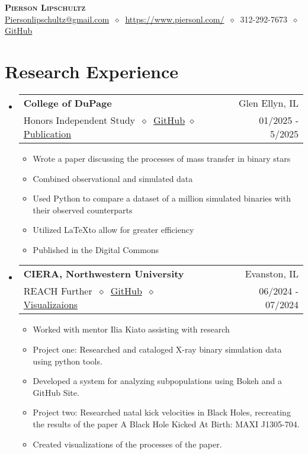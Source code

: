\documentclass[letterpaper,11pt]{article}
\makeatletter
\newcommand{\cvitem}[1]{
  \item\small{
    {#1\vspace{-2pt}}
  }
}
\newcommand{\cvheading}[4]{
  \vspace{-2pt}\item
    \begin{tabular*}{\textwidth}[t]{l@{\extracolsep{\fill}}r}
      \textbf{#1} & #2 \\
      \small#3 & \small #4 \\
    \end{tabular*}\vspace{-7pt}
}
\newcommand{\cvheadingstart}{\begin{itemize}[leftmargin=0in, label={}]}
\newcommand{\cvheadingend}{\end{itemize}}
\newcommand{\cvitemstart}{\begin{itemize}[label=\textopenbullet]\justifying}
\newcommand{\cvitemend}{\end{itemize}\vspace{-5pt}}
\makeatother
\begin{document}
\begin{center}
  \textbf{\LARGE\scshape Pierson Lipschultz} \\
  \vspace{1pt}\small
  \href{mailto:}{Piersonlipschultz@gmail.com}
  $\ \diamond\ $
  \href{https://www.piersonl.com/}{https://www.piersonl.com/}
  $\ \diamond\ $ 
  312-292-7673
  $\ \diamond\ $
  \href{https://github.com/PiersonLip}{GitHub}
\end{center}

\section{Research Experience}
\cvheadingstart
  \cvheading
    {College of DuPage}{Glen Ellyn, IL}
    {Honors Independent Study $\ \diamond\ $ \href{https://github.com/PiersonLip/Honors-Independent-Study}{GitHub} $\diamond$ \href{https://dc.cod.edu/srs/2025/schedule/25/}{Publication}}{01/2025 - 5/2025}
  \cvitemstart
    \cvitem{Wrote a paper discussing the processes of mass transfer in binary stars}
    \cvitem{Combined observational and simulated data}
    \cvitem{Used Python to compare a dataset of a million simulated binaries with their observed counterparts}
    \cvitem{Utilized \LaTeX to allow for greater efficiency}
    \cvitem{Published in the Digital Commons}
  \cvitemend

  \cvheading
    {CIERA, Northwestern University}{Evanston, IL}
    {REACH Further $\ \diamond\ $ \href{https://piersonlip.github.io/XB/}{GitHub} $\ \diamond\ $ \href{https://youtube.com/playlist?list=PLq73rWo79HTuEUPYdUz11PpY6DLhuF9Wl\&si=VjHikj-V-IePgofn}{Visualizaions}}{06/2024 - 07/2024}

  \cvitemstart
    \cvitem{Worked with mentor Ilia Kiato assisting with research}
    \cvitem{Project one: Researched and cataloged X-ray binary simulation data using python tools.}
    \cvitem{Developed a system for analyzing subpopulations using Bokeh and a GitHub Site.}
    \cvitem{Project two: Researched natal kick velocities in Black Holes, recreating the results of the paper A Black Hole Kicked At Birth: MAXI J1305-704.}
    \cvitem{Created visualizations of the processes of the paper.}
  \cvitemend


\cvheadingend
\end{document}
